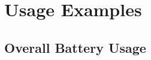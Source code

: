 \section{Usage Examples}
\label{sec-usage}

\subsection{Overall Battery Usage}
\label{subsec-batteryoverview}
